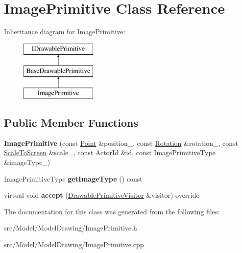 \hypertarget{classImagePrimitive}{}\section{Image\+Primitive Class Reference}
\label{classImagePrimitive}
Inheritance diagram for Image\+Primitive\+:\begin{figure}[H]
\begin{center}
\leavevmode
\includegraphics[height=3.000000cm]{classImagePrimitive}
\end{center}
\end{figure}
\subsection*{Public Member Functions}
\begin{DoxyCompactItemize}
\item 
{\bfseries Image\+Primitive} (const \hyperlink{classPoint}{Point} \&position\+\_\+, const \hyperlink{classRotation}{Rotation} \&rotation\+\_\+, const \hyperlink{classScaleToScreen}{Scale\+To\+Screen} \&scale\+\_\+, const Actor\+Id \&id, const Image\+Primitive\+Type \&image\+Type\+\_\+)\hypertarget{classImagePrimitive_a0d35b1b34707ccb99a843fe7cf0681af}{}\label{classImagePrimitive_a0d35b1b34707ccb99a843fe7cf0681af}

\item 
Image\+Primitive\+Type {\bfseries get\+Image\+Type} () const \hypertarget{classImagePrimitive_ac2ac781665a5eedbdf3dba72c98abe81}{}\label{classImagePrimitive_ac2ac781665a5eedbdf3dba72c98abe81}

\item 
virtual void {\bfseries accept} (\hyperlink{classDrawablePrimitiveVisitor}{Drawable\+Primitive\+Visitor} \&visitor) override\hypertarget{classImagePrimitive_a5ae2d03cfafb4ff31d7cefef197c142d}{}\label{classImagePrimitive_a5ae2d03cfafb4ff31d7cefef197c142d}

\end{DoxyCompactItemize}


The documentation for this class was generated from the following files\+:\begin{DoxyCompactItemize}
\item 
src/\+Model/\+Model\+Drawing/Image\+Primitive.\+h\item 
src/\+Model/\+Model\+Drawing/Image\+Primitive.\+cpp\end{DoxyCompactItemize}
